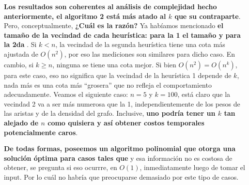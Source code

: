 \documentclass[10pt,a4paper]{article}
\begin{document}
\textbf{Los resultados son coherentes al análisis de complejidad hecho anteriormente, el algoritmo 2 está más atado al $k$ que su contraparte}. Pero, conceptualmente, \textbf{¿Cuál es la razón?} Ya habíamos mencionado \textbf{el tamaño de la vecindad de cada heurística: para la 1 el tamaño  y para la 2da }. Si $k < n$, la vecindad de la segunda heurística tiene una cota más ajustada de $O(n^2)$, por eso las mediciones son similares para dicho caso. En cambio, si $k \geq n$, ninguna se tiene una cota mejor. Si bien $O(n^2) = O(n^k)$, para este caso, eso no significa que la vecindad de la heurística 1 depende de $k$, nada más es una cota más ``grosera'' que no refleja el comportamiento adecuadamente. Veamos el siguiente caso: $n = 5$ y $k = 100$, está claro que la vecindad 2 va a ser más numerosa que la 1, independientemente de los pesos de las aristas y de la densidad del grafo. Inclusive, \textbf{uno podría tener un $k$ tan alejado de $n$ como quisiera y así obtener costos temporales potencialmente caros}. 

\textbf{De todas formas, poseemos un algoritmo polinomial que otorga una solución óptima para casos tales que } y esa información no es costosa de obtener, se pregunta si eso ocurrre, en $O(1)$, inmediatamente luego de tomar el input. Por lo cuál no habría que preocuparse demasiado por este tipo de casos.
\end{document}
